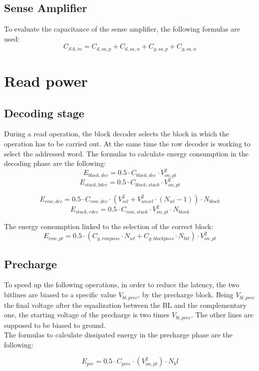 \subsection{Sense Amplifier}
\label{subsec:dec_capacitance}
To evaluate the capacitance of the sense amplifier, the following formulas are used:
\[
C_{SA,in}=C_{d,sa,p}+C_{d,sa,n}+C_{g,sa,p}+C_{g,sa,n}
\]

\section{Read power}
\label{sec:read_power}

\subsection{Decoding stage}
\label{sec:decoding_stage}
During a read operation, the block decoder selects the block in which the operation has to be carried out.
At the same time the row decoder is working to select the addressed word.
The formulas to calculate energy consumption in the decoding phase are the following:
\[
E_{block,dec}= 0.5 \cdot C_{block,dec} \cdot V_{on,pt}^2
\]
\[
E_{stack,bdec}=0.5 \cdot C_{block,stack} \cdot V_{on,pt}^2
\]

\[
E_{row,dec}= 0.5 \cdot C_{row,dec} \cdot (V_{sel}^2+ V_{unsel}^2 \cdot (N_{wl}-1)) \cdot N_{block}
\]
\[
E_{stack,rdec}=0.5 \cdot C_{row,stack} \cdot V_{on,pt}^2 \cdot N_{block}
\]

The energy consumption linked to the selection of the correct block:
\[
E_{row,pt}= 0.5 \cdot (C_{g,rowpass} \cdot N_{wl} + C_{g,blockpass} \cdot N_{bit}) \cdot V_{on,pt}^2
\]

\subsection{Precharge}
\label{sec:precharge}
To speed up the following operations, in order to reduce the latency, the two bitlines are biased to a specific value $V_{bl,prec}$, by the precharge block. Being $V_{bl,prec}$ the final voltage after the equalization between the BL and the complementary one, the starting voltage of the precharge is two times $V_{bl,prec}$. The other lines are supposed to be biased to ground.\\
The formulas to calculate dissipated energy in the precharge phase are the following:

\[
E_{pre}= 0.5 \cdot C_{prec} \cdot (V_{on,pt}^2) \cdot N_bl
\]

